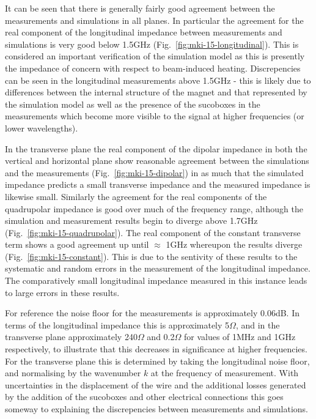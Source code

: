 It can be seen that there is generally fairly good agreement between the measurements and simulations in all planes. In particular the agreement for the real component of the longitudinal impedance between measurements and simulations is very good below 1.5GHz (Fig.~\ref{fig:mki-15-longitudinal}). This is considered an important verification of the simulation model as this is presently the impedance of  concern with respect to beam-induced heating. Discrepencies can be seen in the longitudinal measurements above 1.5GHz - this is likely due to differences between the internal structure of the magnet and that represented by the simulation model as well as the presence of the sucoboxes in the measurements which become more visible to the signal at higher frequencies (or lower wavelengths).

In the transverse plane the real component of the dipolar impedance in both the vertical and horizontal plane show reasonable agreement between the simulations and the measurements (Fig.~\ref{fig:mki-15-dipolar}) in as much that the simulated impedance predicts a small transverse impedance and the measured impedance is likewise small. Similarly the agreement for the real components of the quadrupolar impedance is good over much of the frequency range, although the simulation and measurement results begin to diverge above 1.7GHz (Fig.~\ref{fig:mki-15-quadrupolar}). The real component of the constant transverse term shows a good agreement up until $\approx$ 1GHz whereupon the results diverge (Fig.~\ref{fig:mki-15-constant}). This is due to the sentivity of these results to the systematic and random errors in the measurement of the longitudinal impedance. The comparatively small longitudinal impedance measured in this instance leads to large errors in these results. 

For reference the noise floor for the measurements is approximately 0.06dB. In terms of the longitudinal impedance this is approximately 5$\Omega$, and in the transverse plane approximately 240$\Omega$ and 0.2$\Omega$ for values of 1MHz and 1GHz respectively, to illustrate that this decreases in significance at higher frequencies. For the transverse plane this is determined by taking the longitudinal noise floor, and normalising by the wavenumber $k$ at the frequency of measurement. With uncertainties in the displacement of the wire and the additional losses generated by the addition of the sucoboxes and other electrical connections this goes someway to explaining the discrepencies between measurements and simulations. 

